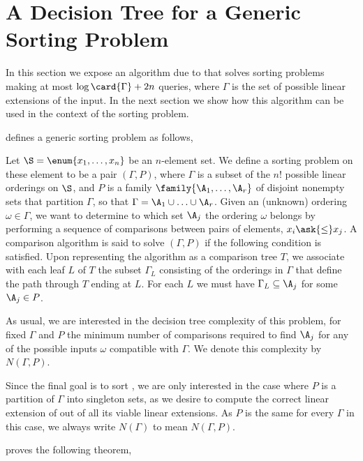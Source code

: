 \section{A Decision Tree for a Generic Sorting Problem}
\label{tree:xy:dt}

In this section we expose an algorithm due to \citet*{fredman:1976}
that solves sorting problems making at most $\log\card{\Gamma} + 2n$ queries,
where $\Gamma$ is the set of possible linear extensions of the input. In the
next section we show how this algorithm can be used in the context of the
sorting \XY problem.

\citet{fredman:1976} defines a generic sorting problem as follows,

\begin{problem}
Let $\S = \enum{x_1, \ldots, x_n}$ be an $n$-element set. We define a sorting
problem on these element to be a pair $(\Gamma, P)$, where $\Gamma$ is a
subset of the $n!$ possible linear orderings on $\S$, and
$P$ is a family $\family{\A_1, \ldots, \A_r}$ of disjoint nonempty sets that
partition $\Gamma$, so that $\Gamma = \A_1 \cup \ldots \cup \A_r$. Given an
(unknown) ordering $\omega \in \Gamma$, we want to determine to which set $\A_j$ the
ordering $\omega$ belongs by performing a sequence of comparisons between
pairs of elements, $x_i \ask{\le} x_j$. A comparison algorithm is said to
solve $(\Gamma, P)$ if the following condition is satisfied. Upon representing
the algorithm as a comparison tree $T$, we associate with each leaf $L$ of $T$
the subset $\Gamma_L$ consisting of the orderings in $\Gamma$ that define the
path through $T$ ending at $L$. For each $L$ we must have $\Gamma_L \subseteq
\A_j$ for some $\A_j \in P$.
\end{problem}

As usual, we are interested in the decision tree complexity of this
problem, \ie for fixed \(\Gamma\) and \(P\) the minimum number of comparisons
required to find \(\A_j\) for any of the possible inputs \(\omega\) compatible
with \(\Gamma\). We denote this complexity by $N(\Gamma, P)$.

Since the final goal is to sort \XY, we are only interested in the case
where $P$ is a partition of $\Gamma$ into singleton sets, as we desire to
compute the correct linear extension of \XY out of all its viable linear
extensions. As $P$ is the same for every $\Gamma$ in this case, we
always write $N(\Gamma)$ to mean $N(\Gamma, P)$.

\citet{fredman:1976} proves the following theorem,

